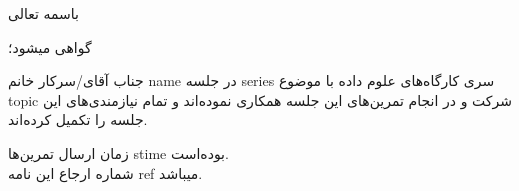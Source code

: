 \documentclass[10pt,a5paper]{letter}
\date{} %
\begin{document}
\begin{letter}{\centerline{باسمه تعالی}}






\opening{
گواهی میشود؛
}

جناب آقای/سرکار خانم 
{{{name}}}
 در جلسه 
{{{series}}}
  سری کارگاه‌های علوم داده با موضوع 
{{{topic}}}
  شرکت و در انجام تمرین‌های این جلسه همکاری نموده‌اند و تمام نیازمندی‌های این جلسه را تکمیل کرده‌اند.
  
زمان ارسال تمرین‌ها 
{{{stime}}}
 بوده‌است.
\\
شماره ارجاع این نامه 
{{{ref}}}
 میباشد.
\\
\\
\\
\\
\\
\\


\end{letter}
\end{document}
